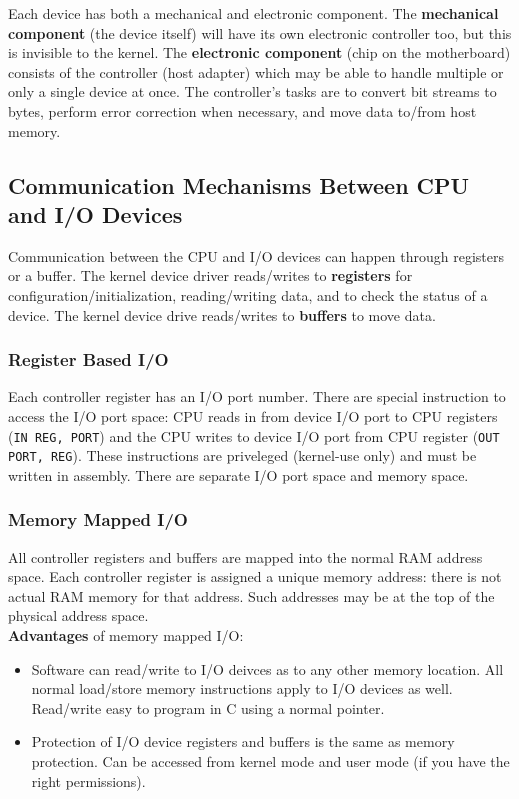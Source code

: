 \documentclass{article}
\newcommand{\bold}[1]{\textbf{#1}}
\renewcommand{\b}{\item[$\circ$]}
\newcommand{\newlist}{\begin{itemize}}
\renewcommand{\endlist}{\end{itemize}}
\newcommand{\code}[1]{\texttt{#1}}
\begin{document}
Each device has both a mechanical and electronic component. The \bold{mechanical component} (the device itself) will have its own electronic controller too, but this is invisible to the kernel. The \bold{electronic component} (chip on the motherboard) consists of the controller (host adapter) which may be able to handle multiple or only a single device at once. The controller's tasks are to convert bit streams to bytes, perform error correction when necessary, and move data to/from host memory. 

\subsection{Communication Mechanisms Between CPU and I/O Devices}

Communication between the CPU and I/O devices can happen through registers or a buffer. The kernel device driver reads/writes to \bold{registers} for configuration/initialization, reading/writing data, and to check the status of a device. The kernel device drive reads/writes to \bold{buffers} to move data. 

\subsubsection{Register Based I/O}

Each controller register has an I/O port number. There are special instruction to access the I/O port space: CPU reads in from device I/O port to CPU registers (\code{IN REG, PORT}) and the CPU writes to device I/O port from CPU register (\code{OUT PORT, REG}). These instructions are priveleged (kernel-use only) and must be written in assembly. There are separate I/O port space and memory space. 

\subsubsection{Memory Mapped I/O}

All controller registers and buffers are mapped into the normal RAM address space. Each controller register is assigned a unique memory address: there is not actual RAM memory for that address. Such addresses may be at the top of the physical address space. \\ 

\bold{Advantages} of memory mapped I/O:

\newlist 
\b Software can read/write to I/O deivces as to any other memory location. All normal load/store memory instructions apply to I/O devices as well. Read/write easy to program in C using a normal pointer. 
\b Protection of I/O device registers and buffers is the same as memory protection. Can be accessed from kernel mode and user mode (if you have the right permissions). 
\endlist 
\end{document}
